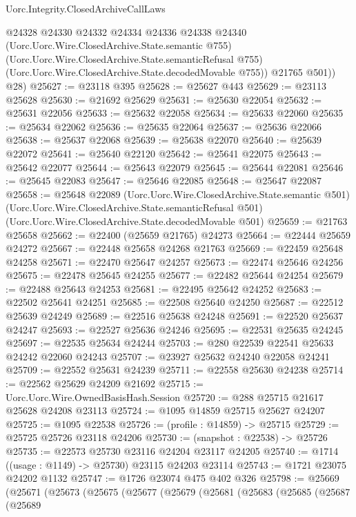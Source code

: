 \begin{lexlean}{Uorc.Integrity.ClosedArchiveCallLaws}
\begin{coremodule}
            @24328
            @24330
            @24332
            @24334
            @24336
            @24338
            @24340
            (Uorc.Uorc.Wire.ClosedArchive.State.semantic @755)
            (Uorc.Uorc.Wire.ClosedArchive.State.semanticRefusal @755)
            (Uorc.Uorc.Wire.ClosedArchive.State.decodedMovable @755))
          @21765
          @501))
      @28)
@25627 := @23118 @395
@25628 := @25627 @443
@25629 := @23113 @25628
@25630 := @21692 @25629
@25631 := @25630 @22054
@25632 := @25631 @22056
@25633 := @25632 @22058
@25634 := @25633 @22060
@25635 := @25634 @22062
@25636 := @25635 @22064
@25637 := @25636 @22066
@25638 := @25637 @22068
@25639 := @25638 @22070
@25640 := @25639 @22072
@25641 := @25640 @22120
@25642 := @25641 @22075
@25643 := @25642 @22077
@25644 := @25643 @22079
@25645 := @25644 @22081
@25646 := @25645 @22083
@25647 := @25646 @22085
@25648 := @25647 @22087
@25658 := @25648
    @22089
    (Uorc.Uorc.Wire.ClosedArchive.State.semantic @501)
    (Uorc.Uorc.Wire.ClosedArchive.State.semanticRefusal @501)
    (Uorc.Uorc.Wire.ClosedArchive.State.decodedMovable @501)
@25659 := @21763 @25658
@25662 := @22400 (@25659 @21765) @24273
@25664 := @22444 @25659 @24272
@25667 := @22448 @25658 @24268 @21763
@25669 := @22459 @25648 @24258
@25671 := @22470 @25647 @24257
@25673 := @22474 @25646 @24256
@25675 := @22478 @25645 @24255
@25677 := @22482 @25644 @24254
@25679 := @22488 @25643 @24253
@25681 := @22495 @25642 @24252
@25683 := @22502 @25641 @24251
@25685 := @22508 @25640 @24250
@25687 := @22512 @25639 @24249
@25689 := @22516 @25638 @24248
@25691 := @22520 @25637 @24247
@25693 := @22527 @25636 @24246
@25695 := @22531 @25635 @24245
@25697 := @22535 @25634 @24244
@25703 := @280 @22539 @22541 @25633 @24242 @22060 @24243
@25707 := @23927 @25632 @24240 @22058 @24241
@25709 := @22552 @25631 @24239
@25711 := @22558 @25630 @24238
@25714 := @22562 @25629 @24209 @21692
@25715 := Uorc.Uorc.Wire.OwnedBasisHash.Session
@25720 := @288 @25715 @21617 @25628 @24208 @23113
@25724 := @1095 @14859 @25715 @25627 @24207
@25725 := @1095 @22538
@25726 := (profile : @14859) -> @25715
@25729 := @25725 @25726 @23118 @24206
@25730 := (snapshot : @22538) -> @25726
@25735 := @22573 @25730 @23116 @24204 @23117 @24205
@25740 := @1714 ((usage : @1149) -> @25730) @23115 @24203 @23114
@25743 := @1721 @23075 @24202 @1132
@25747 := @1726 @23074 @475 @402 @326
@25798 := @25669
    (@25671
      (@25673
        (@25675
          (@25677
            (@25679
              (@25681
                (@25683
                  (@25685
                    (@25687
                      (@25689

\end{coremodule}
\end{lexlean}
